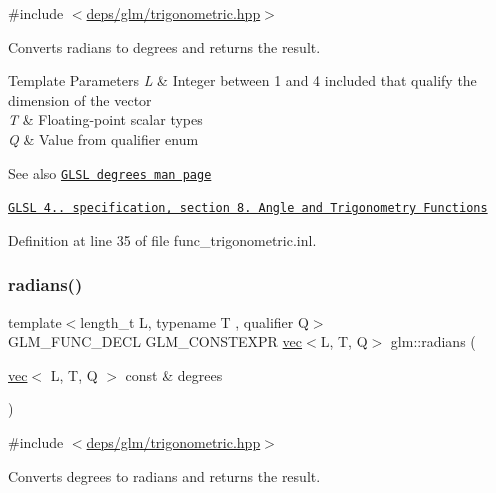 {\ttfamily \#include $<$\hyperlink{trigonometric_8hpp}{deps/glm/trigonometric.\+hpp}$>$}

Converts radians to degrees and returns the result.


\begin{DoxyTemplParams}{Template Parameters}
{\em L} & Integer between 1 and 4 included that qualify the dimension of the vector \\
\hline
{\em T} & Floating-\/point scalar types \\
\hline
{\em Q} & Value from qualifier enum\\
\hline
\end{DoxyTemplParams}
\begin{DoxySeeAlso}{See also}
\href{http://www.opengl.org/sdk/docs/manglsl/xhtml/degrees.xml}{\tt G\+L\+SL degrees man page} 

\href{http://www.opengl.org/registry/doc/GLSLangSpec.4.20.8.pdf}{\tt G\+L\+SL 4.. specification, section 8. Angle and Trigonometry Functions} 
\end{DoxySeeAlso}


Definition at line 35 of file func\+\_\+trigonometric.\+inl.

\mbox{\label{group__core__func__trigonometric_ga6e1db4862c5e25afd553930e2fdd6a68}} 
\subsubsection{\texorpdfstring{radians()}{radians()}}
{\footnotesize\ttfamily template$<$length\+\_\+t L, typename T , qualifier Q$>$ \\
G\+L\+M\+\_\+\+F\+U\+N\+C\+\_\+\+D\+E\+CL G\+L\+M\+\_\+\+C\+O\+N\+S\+T\+E\+X\+PR \hyperlink{structglm_1_1vec}{vec}$<$L, T, Q$>$ glm\+::radians (\begin{DoxyParamCaption}\item[{\hyperlink{structglm_1_1vec}{vec}$<$ L, T, Q $>$ const \&}]{degrees }\end{DoxyParamCaption})}



{\ttfamily \#include $<$\hyperlink{trigonometric_8hpp}{deps/glm/trigonometric.\+hpp}$>$}

Converts degrees to radians and returns the result.



